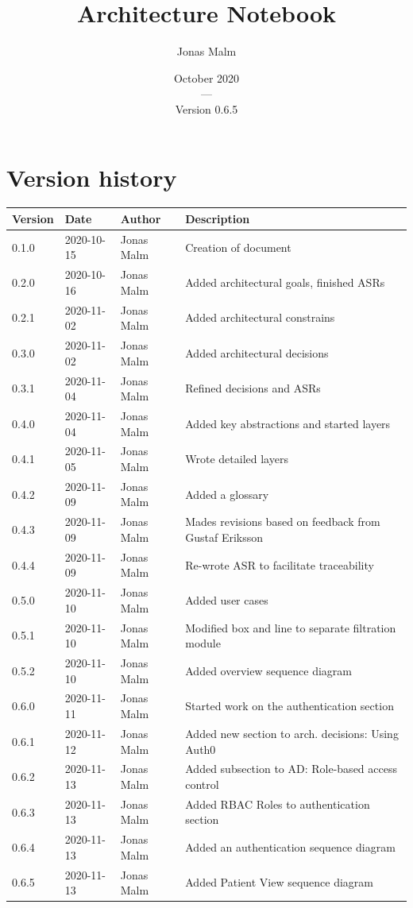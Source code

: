 \documentclass{article}
\title{Architecture Notebook}
\author{Jonas Malm}
\date{October 2020\\---\\Version 0.6.5}
\begin{document}
\maketitle
\clearpage

\begin{table}
\section*{Version history}
\centering
\begin{tabular}{|l|l|l|l|}
\hline
Version & Date & Author & Description \\ \hline
0.1.0 & 2020-10-15 & Jonas Malm & Creation of document\\ 
0.2.0 & 2020-10-16 & Jonas Malm & Added architectural goals, finished ASRs\\
0.2.1 & 2020-11-02 & Jonas Malm & Added architectural constrains\\ 
0.3.0 & 2020-11-02 & Jonas Malm & Added architectural decisions\\
0.3.1 & 2020-11-04 & Jonas Malm & Refined decisions and ASRs\\
0.4.0 & 2020-11-04 & Jonas Malm & Added key abstractions and started layers\\
0.4.1 & 2020-11-05 & Jonas Malm & Wrote detailed layers\\
0.4.2 & 2020-11-09 & Jonas Malm & Added a glossary\\
0.4.3 & 2020-11-09 & Jonas Malm & Mades revisions based on feedback from Gustaf Eriksson\\
0.4.4 & 2020-11-09 & Jonas Malm & Re-wrote ASR to facilitate traceability\\
0.5.0 & 2020-11-10 & Jonas Malm & Added user cases\\
0.5.1 & 2020-11-10 & Jonas Malm & Modified box and line to separate filtration module\\
0.5.2 & 2020-11-10 & Jonas Malm & Added overview sequence diagram\\
0.6.0 & 2020-11-11 & Jonas Malm & Started work on the authentication section\\
0.6.1 & 2020-11-12 & Jonas Malm & Added new section to arch. decisions: Using Auth0\\
0.6.2 & 2020-11-13 & Jonas Malm & Added subsection to AD: Role-based access control\\
0.6.3 & 2020-11-13 & Jonas Malm & Added RBAC Roles to authentication section\\
0.6.4 & 2020-11-13 & Jonas Malm & Added an authentication sequence diagram\\
0.6.5 & 2020-11-13 & Jonas Malm & Added Patient View sequence diagram\\
\hline
\end{tabular}
\end{table}
\end{document}
